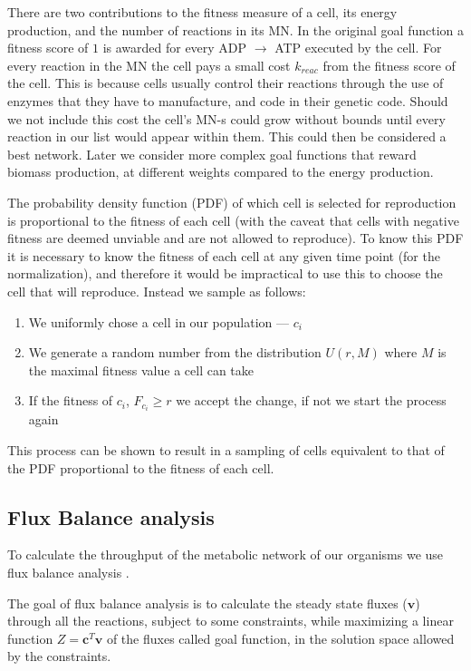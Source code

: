 \documentclass[a4paper,12pt]{article}
\begin{document}
There are two contributions to the fitness measure of a cell, its energy production, and the number of reactions in its MN.  In the original goal function a fitness score of $1$ is awarded for every ADP $\rightarrow$ ATP executed by the cell. For every reaction in the MN the cell pays a small cost $k_{reac}$  from the fitness score of the cell. This is because cells usually control their reactions through the use of enzymes that they have to manufacture, and code in their genetic code. Should we not include this cost the cell's MN-s could grow without bounds until every reaction in our list would appear within them. This could then be considered a best network. Later we consider more complex goal functions that reward biomass production, at different weights compared to the energy production. 

The probability density function (PDF) of which cell is selected for reproduction is proportional to the fitness of each cell (with the caveat that cells with negative fitness are deemed unviable and are not allowed to reproduce). To know this PDF it is necessary to know the fitness of each cell at any given time point (for the normalization), and therefore it would be impractical to use this to choose the cell that will reproduce. Instead we sample as follows: 
\begin{enumerate}
	\item We uniformly chose a cell in our population --- $c_i$
	\item We generate a random number from the distribution $U \left( r,M \right)$ where $M$ is the maximal fitness value a cell can take
	\item If the fitness of $c_i$,  $F_{c_i} \geq r$ we accept the change, if not we start the process again
\end{enumerate}

This process can be shown to result in a sampling of cells equivalent to that of the PDF proportional to the fitness of each cell.


\subsection{Flux Balance analysis}
\label{sub:Flux Balance analysis}


	To calculate the throughput of the metabolic network of our organisms we use flux balance analysis \cite{whatisfluxbalance}. 	

	The goal of flux balance analysis is to calculate the steady state fluxes ($\mathbf{v}$) through all the reactions, subject to some constraints, while maximizing a linear function $Z=\mathbf{c}^T \mathbf{v}$ of the fluxes called goal function, in the solution space allowed by the constraints. 
\end{document}
